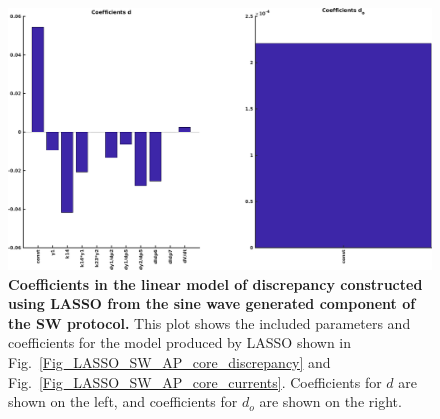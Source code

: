 \documentclass[11pt,a4paper,oneside]{article}
\begin{document}
\clearpage

\begin{figure}[t]
\begin{center}
\includegraphics[scale=0.42]{Figures/LASSO_SW_AP_core_coefficients.png}
\caption{\textbf{Coefficients in the linear model of discrepancy constructed using LASSO from the sine wave generated component of the SW protocol.} This plot shows the included parameters and coefficients for the model produced by LASSO shown in Fig.~\ref{Fig_LASSO_SW_AP_core_discrepancy} and Fig.~\ref{Fig_LASSO_SW_AP_core_currents}. Coefficients for $d$ are shown on the left, and coefficients for $d_o$ are shown on the right.} 
\label{Fig_LASSO_SW_AP_core_coefficients}
\end{center}
\end{figure}
\end{document}
